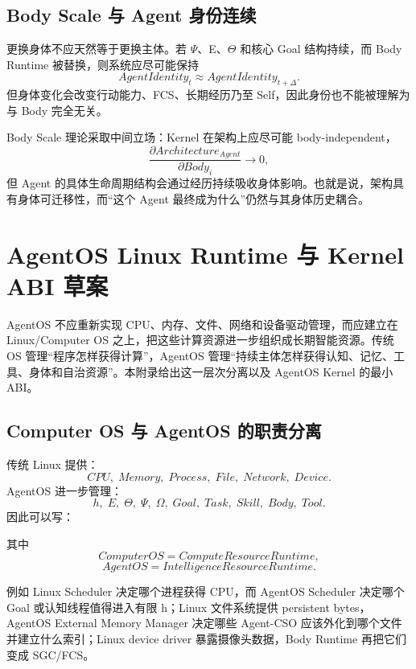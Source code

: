 \section{Body Scale 与 Agent 身份连续}

更换身体不应天然等于更换主体。若 $\Psi$、E、$\Theta$ 和核心 Goal 结构持续，而 Body Runtime 被替换，则系统应尽可能保持
\[
AgentIdentity_t
\approx
AgentIdentity_{t+\Delta}.
\]
但身体变化会改变行动能力、FCS、长期经历乃至 Self，因此身份也不能被理解为与 Body 完全无关。

Body Scale 理论采取中间立场：Kernel 在架构上应尽可能 body-independent，
\[
\frac{\partial Architecture_{Agent}}
{\partial Body_i}\rightarrow0,
\]
但 Agent 的具体生命周期结构会通过经历持续吸收身体影响。也就是说，架构具有身体可迁移性，而“这个 Agent 最终成为什么”仍然与其身体历史耦合。


\chapter{AgentOS Linux Runtime 与 Kernel ABI 草案}
\label{app:linux}

\begin{chapterlead}
AgentOS 不应重新实现 CPU、内存、文件、网络和设备驱动管理，而应建立在 Linux/Computer OS 之上，把这些计算资源进一步组织成长期智能资源。传统 OS 管理“程序怎样获得计算”，AgentOS 管理“持续主体怎样获得认知、记忆、工具、身体和自治资源”。本附录给出这一层次分离以及 AgentOS Kernel 的最小 ABI。
\end{chapterlead}

\section{Computer OS 与 AgentOS 的职责分离}

传统 Linux 提供：
\[
CPU,\;Memory,\;Process,\;File,\;Network,\;Device.
\]
AgentOS 进一步管理：
\[
h,\;E,\;\Theta,\;\Psi,\;\Omega,\;Goal,\;Task,\;Skill,\;Body,\;Tool.
\]
因此可以写：
\begin{statementbox}
\centering
{}
\end{statementbox}
其中
\[
ComputerOS
=
ComputeResourceRuntime,
\]
\[
AgentOS
=
IntelligenceResourceRuntime.
\]

例如 Linux Scheduler 决定哪个进程获得 CPU，而 AgentOS Scheduler 决定哪个 Goal 或认知线程值得进入有限 h；Linux 文件系统提供 persistent bytes，AgentOS External Memory Manager 决定哪些 Agent-CSO 应该外化到哪个文件并建立什么索引；Linux device driver 暴露摄像头数据，Body Runtime 再把它们变成 SGC/FCS。

